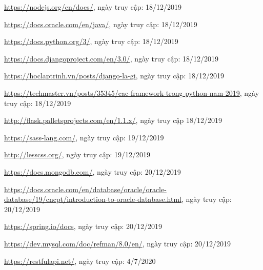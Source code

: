\newpage
\begin{thebibliography}{80}

\bibitem{}
\url{https://nodejs.org/en/docs/}, ngày truy cập: 18/12/2019

\bibitem{}
\url{https://docs.oracle.com/en/java/}, ngày truy cập: 18/12/2019

\bibitem{}
\url{https://docs.python.org/3/}, ngày truy cập: 18/12/2019

\bibitem{}
\url{https://docs.djangoproject.com/en/3.0/}, ngày truy cập: 18/12/2019

\bibitem{}
\url{https://hoclaptrinh.vn/posts/django-la-gi}, ngày truy cập: 18/12/2019

\bibitem{}
\url{https://techmaster.vn/posts/35345/cac-framework-trong-python-nam-2019}, ngày truy cập: 18/12/2019

\bibitem{}
\url{http://flask.palletsprojects.com/en/1.1.x/}, ngày truy cập 18/12/2019


\bibitem{}
\url{https://sass-lang.com/}, ngày truy cập: 19/12/2019

\bibitem{}
\url{http://lesscss.org/}, ngày truy cập: 19/12/2019

\bibitem{}
\url{https://docs.mongodb.com/}, ngày truy cập: 20/12/2019

\bibitem{}
\url{https://docs.oracle.com/en/database/oracle/oracle-database/19/cncpt/introduction-to-oracle-database.html}, ngày truy cập: 20/12/2019

\bibitem{}
\url{https://spring.io/docs}, ngày truy cập: 20/12/2019

\bibitem{}
\url{https://dev.mysql.com/doc/refman/8.0/en/}, ngày truy cập: 20/12/2019

\bibitem{}
\url{https://restfulapi.net/}, ngày truy cập: 4/7/2020

\end{thebibliography}
